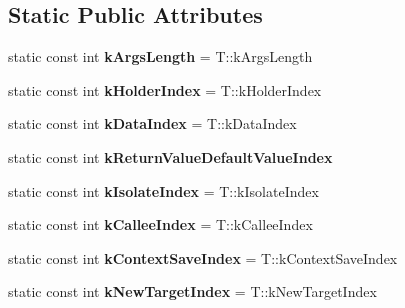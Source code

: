 \subsection*{Static Public Attributes}
\begin{DoxyCompactItemize}
\item 
static const int {\bfseries k\+Args\+Length} = T\+::k\+Args\+Length\hypertarget{classv8_1_1internal_1_1_function_callback_arguments_a418aef384caf837dd281952afb2ae5a7}{}\label{classv8_1_1internal_1_1_function_callback_arguments_a418aef384caf837dd281952afb2ae5a7}

\item 
static const int {\bfseries k\+Holder\+Index} = T\+::k\+Holder\+Index\hypertarget{classv8_1_1internal_1_1_function_callback_arguments_a1b198f7e951f79e969f19a627250bc8f}{}\label{classv8_1_1internal_1_1_function_callback_arguments_a1b198f7e951f79e969f19a627250bc8f}

\item 
static const int {\bfseries k\+Data\+Index} = T\+::k\+Data\+Index\hypertarget{classv8_1_1internal_1_1_function_callback_arguments_a128ce8dd01b7536c09ac8424f656a627}{}\label{classv8_1_1internal_1_1_function_callback_arguments_a128ce8dd01b7536c09ac8424f656a627}

\item 
static const int {\bfseries k\+Return\+Value\+Default\+Value\+Index}
\item 
static const int {\bfseries k\+Isolate\+Index} = T\+::k\+Isolate\+Index\hypertarget{classv8_1_1internal_1_1_function_callback_arguments_a1381736593fe4d9bf415e577662ac8d9}{}\label{classv8_1_1internal_1_1_function_callback_arguments_a1381736593fe4d9bf415e577662ac8d9}

\item 
static const int {\bfseries k\+Callee\+Index} = T\+::k\+Callee\+Index\hypertarget{classv8_1_1internal_1_1_function_callback_arguments_a113666386ff34888b2da7a750e8336ba}{}\label{classv8_1_1internal_1_1_function_callback_arguments_a113666386ff34888b2da7a750e8336ba}

\item 
static const int {\bfseries k\+Context\+Save\+Index} = T\+::k\+Context\+Save\+Index\hypertarget{classv8_1_1internal_1_1_function_callback_arguments_acd7df7ab491d09c1332a2627da688a70}{}\label{classv8_1_1internal_1_1_function_callback_arguments_acd7df7ab491d09c1332a2627da688a70}

\item 
static const int {\bfseries k\+New\+Target\+Index} = T\+::k\+New\+Target\+Index\hypertarget{classv8_1_1internal_1_1_function_callback_arguments_a68cfc624ddc5d17b087c623a1d4c649e}{}\label{classv8_1_1internal_1_1_function_callback_arguments_a68cfc624ddc5d17b087c623a1d4c649e}

\end{DoxyCompactItemize}
